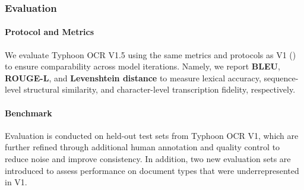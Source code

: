 \documentclass[]{typhoon} %
\begin{document}

\subsubsection{Evaluation}

\paragraph{Protocol and Metrics} We evaluate Typhoon OCR V1.5 using the same metrics and protocols as V1 () to ensure comparability across model iterations. Namely, we report \textbf{BLEU}, \textbf{ROUGE-L}, and \textbf{Levenshtein distance} to measure lexical accuracy, sequence-level structural similarity, and character-level transcription fidelity, respectively.

\paragraph{Benchmark}

Evaluation is conducted on held-out test sets from Typhoon OCR V1, which are further refined through additional human annotation and quality control to reduce noise and improve consistency. In addition, two new evaluation sets are introduced to assess performance on document types that were underrepresented in V1.
\end{document}
